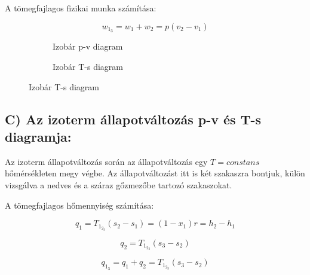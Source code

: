 A tömegfajlagos fizikai munka számítása:

\begin{equation*}
w_1_3 = w_1+w_2 = p(v_2-v_1)
\end{equation*}

\begin{figure}[h]
	\centering
	\begin{subfigure}[b]{0.545\textwidth} 
		\centering
		\begin{tikzpicture}
		
		
		
		\end{tikzpicture}
		\caption{Izobár p-v diagram}
		
	\end{subfigure}
	\begin{subfigure}[b]{0.435\textwidth}
		\centering
		\begin{tikzpicture}
		
		
		
		\end{tikzpicture}
		\caption{Izobár T-s diagram}
		
	\end{subfigure}
\end{figure}

\pagebreak

\subsection*{C) Az izoterm állapotváltozás p-v és T-s diagramja:}

Az izoterm állapotváltozás során az állapotváltozás egy $T=constans$ hőmérsékleten megy végbe. Az állapotváltozást itt is két szakaszra bontjuk, külön vizsgálva a nedves és a száraz gőzmezőbe tartozó szakaszokat.

A tömegfajlagos hőmennyiség számítása:

\begin{equation*}
q_1 = T_1_2_3 (s_2-s_1) = (1-x_1)r = h_2-h_1
\end{equation*}

\begin{equation*}
q_2 = T_1_2_3(s_3-s_2)
\end{equation*}

\begin{equation*}
q_1_3 = q_1+q_2 = T_1_2_3(s_3-s_2)
\end{equation*}

